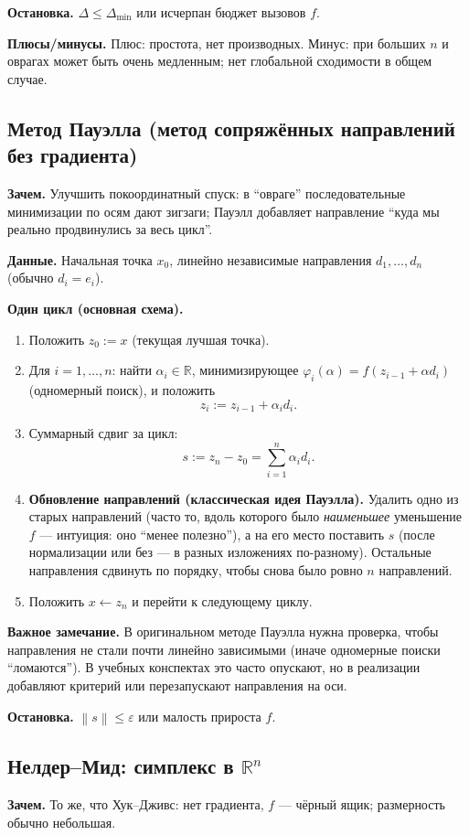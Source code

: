 \documentclass[12pt,a4paper]{article}
\newcommand{\R}{\mathbb{R}}
\newcommand{\norm}[1]{\left\lVert #1\right\rVert}
\begin{document}
\textbf{Остановка.} \(\Delta\le\Delta_{\min}\) или исчерпан бюджет вызовов \(f\).

\textbf{Плюсы/минусы.} Плюс: простота, нет производных. Минус: при больших \(n\) и оврагах может быть очень медленным; нет глобальной сходимости в общем случае.

\subsection{Метод Пауэлла (метод сопряжённых направлений без градиента)}
\textbf{Зачем.} Улучшить покоординатный спуск: в ``овраге'' последовательные минимизации по осям дают зигзаги; Пауэлл добавляет направление ``куда мы реально продвинулись за весь цикл''.

\textbf{Данные.} Начальная точка \(x_0\), линейно независимые направления \(d_1,\ldots,d_n\) (обычно \(d_i=e_i\)).

\textbf{Один цикл (основная схема).}
\begin{enumerate}
  \item Положить \(z_0:=x\) (текущая лучшая точка).
  \item Для \(i=1,\ldots,n\): найти \(\alpha_i\in\R\), минимизирующее \(\varphi_i(\alpha)=f(z_{i-1}+\alpha d_i)\) (одномерный поиск), и положить
  \[
    z_i:=z_{i-1}+\alpha_i d_i.
  \]
  \item Суммарный сдвиг за цикл:
  \[
    s:=z_n-z_0=\sum_{i=1}^n \alpha_i d_i.
  \]
  \item \textbf{Обновление направлений (классическая идея Пауэлла).} Удалить одно из старых направлений (часто то, вдоль которого было \emph{наименьшее} уменьшение \(f\) --- интуиция: оно ``менее полезно''), а на его место поставить \(s\) (после нормализации или без --- в разных изложениях по-разному). Остальные направления сдвинуть по порядку, чтобы снова было ровно \(n\) направлений.
  \item Положить \(x\leftarrow z_n\) и перейти к следующему циклу.
\end{enumerate}

\textbf{Важное замечание.} В оригинальном методе Пауэлла нужна проверка, чтобы направления не стали почти линейно зависимыми (иначе одномерные поиски ``ломаются''). В учебных конспектах это часто опускают, но в реализации добавляют критерий или перезапускают направления на оси.

\textbf{Остановка.} \(\norm{s}\le\varepsilon\) или малость прироста \(f\).

\subsection{Нелдер--Мид: симплекс в \(\R^n\)}
\textbf{Зачем.} То же, что Хук--Дживс: нет градиента, \(f\) --- чёрный ящик; размерность обычно небольшая.
\end{document}
